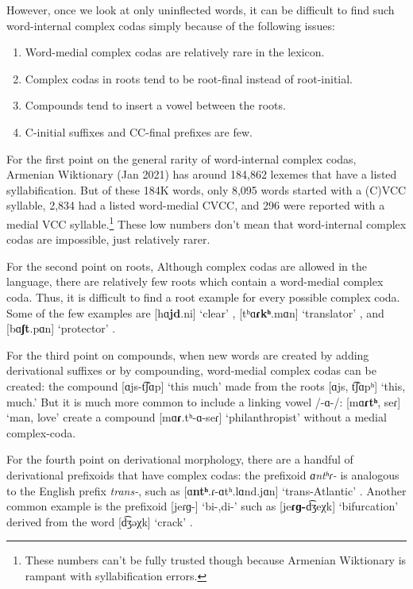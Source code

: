 	However, once we look at only uninflected words, it can be difficult to find such word-internal complex codas simply because of the following issues:
	\begin{enumerate}[noitemsep,topsep=0pt]
		\item Word-medial complex codas are relatively rare in the lexicon. 
		\item Complex codas in roots tend to be root-final instead of root-initial. 
		\item Compounds tend to insert a vowel between the roots. 
		\item C-initial   suffixes and CC-final prefixes  are few. 
	\end{enumerate}
	
	For the first point on the general rarity of word-internal complex codas,   Armenian Wiktionary (Jan 2021) has around 184,862 lexemes that have a listed syllabification.   But of these 184K words, only    8,095  words started with a (C)VCC syllable,        2,834 had a   listed word-medial CVCC,  and 296 were reported with a medial VCC syllable.\footnote{These numbers can't be fully trusted though because Armenian Wiktionary is rampant with syllabification errors.  }  These low numbers don't mean that word-internal complex codas are impossible, just relatively rarer. 
	
	For the second point on roots, Although complex codas are allowed in the language, there are relatively few roots which contain a word-medial complex coda. Thus, it is difficult to find a root example for every possible complex coda. Some of the few examples   are     [hɑ\textbf{jd}.ni] `clear' ,     [tʰɑ\textbf{ɾkʰ}.mɑn] `translator' ,  and  [bɑ\textbf{ʃt}.pɑn] `protector' . 
	
	
	For the third point on compounds, when new words are created by adding derivational suffixes or by compounding, word-medial complex codas can be created: the compound [ɑjs-t͡ʃɑp] `this much'  made from the roots [ɑjs, t͡ʃɑpʰ] `this, much.' But it is much more common to include a linking vowel /-ɑ-/: [mɑ\textbf{ɾtʰ}, seɾ] `man, love'  create a compound [mɑ\textbf{ɾ}.tʰ-ɑ-seɾ] `philanthropist'  without a medial complex-coda.
	
	For the fourth point on derivational morphology, there  are a handful of    derivational prefixoids   that have complex codas: the prefixoid \textit{ɑntʰɾ-}  is analogous to the English prefix \textit{trans-}, such as [ɑ\textbf{ntʰ}.ɾ-ɑtʰ.lɑnd.jɑn] `trans-Atlantic'  . Another common example is the prefixoid [jeɾɡ-] `bi-,di-'  such as [je\textbf{ɾɡ-}d͡ʒeχk] `bifurcation'  derived from the word [d͡ʒəχk] `crack' . 
	
